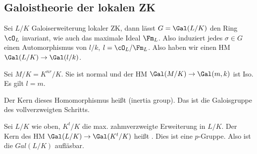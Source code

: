 \subsection{Galoistheorie der lokalen ZK}

Sei $L/K$ Galoiserweiterung lokaler ZK, dann lässt $G=\Gal(L/K)$ den Ring $\cO_L$ invariant, wie auch das maximale Ideal $\Fm_L$. Also induziert jedes $\sigma\in G$ einen Automorphismus von $l/k$, $l=\cO_L/\Fm_L$. Also haben wir einen HM $\Gal(L/K)\rightarrow \Gal(l/k)$.

Sei $M/K=K^{nr}/K$. Sie ist normal und der HM $\Gal(M/K)\rightarrow\Gal(m,k)$ ist Iso. Es gilt $l=m$.

\begin{Definition}
 Der Kern dieses Homomorphismus heißt  (inertia group). Das ist die Galoisgruppe des vollverzweigten Schritts.
\end{Definition}

\begin{Fakt}
 Sei $L/K$ wie oben, $K^t/K$ die max. zahmverzweigte Erweiterung in $L/K$. Der Kern des HM $\Gal(L/K) \rightarrow \Gal(K^t/K)$ heißt . Dies ist eine $p$-Gruppe. Also ist die $Gal(L/K)$ aufläsbar.
\end{Fakt}
